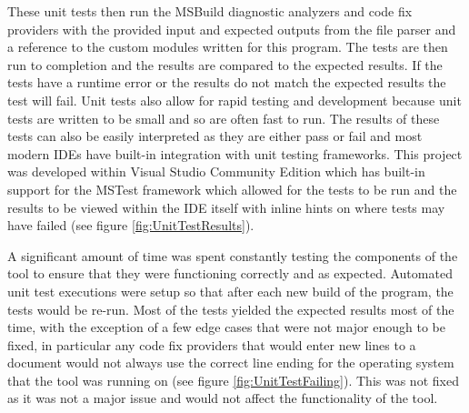 These unit tests then run the MSBuild diagnostic analyzers and code fix providers with the provided input and expected outputs from the file parser and a reference to the custom modules written for this program. The tests are then run to completion and the results are compared to the expected results. If the tests have a runtime error or the results do not match the expected results the test will fail.
Unit tests also allow for rapid testing and development because unit tests are written to be small and so are often fast to run. The results of these tests can also be easily interpreted as they are either pass or fail and most modern IDEs have built-in integration with unit testing frameworks. This project was developed within Visual Studio Community Edition which has built-in support for the MSTest framework which allowed for the tests to be run and the results to be viewed within the IDE itself with inline hints on where tests may have failed (see figure \ref{fig:UnitTestResults}).

A significant amount of time was spent constantly testing the components of the tool to ensure that they were functioning correctly and as expected. Automated unit test executions were setup so that after each new build of the program, the tests would be re-run. Most of the tests yielded the expected results most of the time, with the exception of a few edge cases that were not major enough to be fixed, in particular any code fix providers that would enter new lines to a document would not always use the correct line ending for the operating system that the tool was running on (see figure \ref{fig:UnitTestFailing}). This was not fixed as it was not a major issue and would not affect the functionality of the tool.

